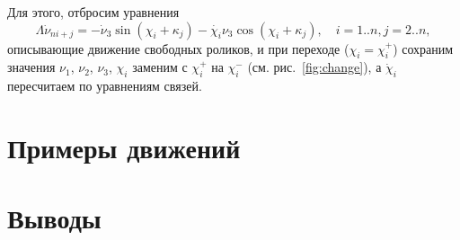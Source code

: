 Для этого, отбросим уравнения
$$
\Lambda\dot{\nu}_{ni+j} = -\dot{\nu}_3\sin(\chi_i+\kappa_j) - \dot{\chi_i}\nu_3\cos(\chi_i+\kappa_j), \quad i = 1..n, j = 2..n,
$$
описывающие движение свободных роликов, и при переходе ($\chi_i = \chi_i^+$) сохраним значения $\nu_1$, $\nu_2$, 
$\nu_3$, $\chi_i$ заменим с $\chi_i^+$ на $\chi_i^-$ (см. рис.~\ref{fig:change}), а $\dot\chi_i$ пересчитаем по уравнениям связей.


\section{Примеры движений}

\section{Выводы}






